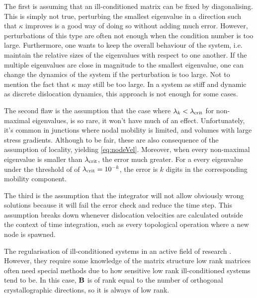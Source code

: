 The first is assuming that an ill-conditioned matrix can be fixed by diagonalising. This is simply not true, perturbing the smallest eigenvalue in a direction such that $\kappa$ improves is a good way of doing so without adding much error. However, perturbations of this type are often not enough when the condition number is too large. Furthermore, one wants to keep the overall behaviour of the system, i.e. maintain the relative sizes of the eigenvalues with respect to one another. If the multiple eigenvalues are close in magnitude to the smallest eigenvalue, one can change the dynamics of the system if the perturbation is too large. Not to mention the fact that $\kappa$ may still be too large. In a system as stiff and dynamic as discrete dislocation dynamics, this approach is not enough for some cases.

The second flaw is the assumption that the case where $\lambda_k < \lambda_{\textrm{crit}}$ for non-maximal eigenvalues, is so rare, it won't have much of an effect. Unfortunately, it's common in junctions where nodal mobility is limited, and volumes with large stress gradients. Although to be fair, these are also consequence of the assumption of locality, yielding \cref{eq:nodeVel}. Moreover, when every non-maximal eigenvalue is smaller than $\lambda_{\textrm{crit}}$, the error much greater. For a every eigenvalue under the threshold of of $\lambda_{\textrm{crit}} = 10^{-k}$, the error is $k$ digits in the corresponding mobility component.

The third is the assumption that the integrator will not allow obviously wrong solutions because it will fail the error check and reduce the time step. This assumption breaks down whenever dislocation velocities are calculated outside the context of time integration, such as every topological operation where a new node is spawned.

The regularisation of ill-conditioned systems in an active field of research \cite{regularisation1,regularisation2,regularisation3}. However, they require some knowledge of the matrix structure low rank matrices often need special methods due to how sensitive low rank ill-conditioned systems tend to be. In this case, $\mathbf{B}$ is of rank equal to the number of orthogonal crystallographic directions, so it is always of low rank.


